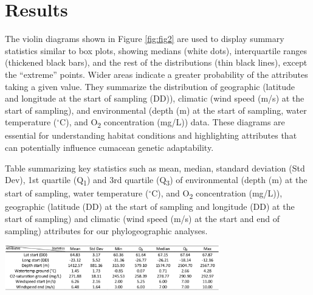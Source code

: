 \section{Results}\label{results}
The violin diagrams shown in Figure \ref{fig:fig2} are used to display summary statistics similar to box plots, showing medians (white dots), interquartile ranges (thickened black bars), and the rest of the distributions (thin black lines), except the ``extreme'' points. Wider areas indicate a greater probability of the attributes taking a given value. They summarize the distribution of geographic (latitude and longitude at the start of sampling (DD)), climatic (wind speed (m/s) at the start of sampling), and environmental (depth (m) at the start of sampling, water temperature ($^\circ$C), and O\textsubscript{2} concentration (mg/L)) data. These diagrams are essential for understanding habitat conditions and highlighting attributes that can potentially influence cumacean genetic adaptability. 

\begin{table}[H]
    \centering
    \caption{Table summarizing key statistics such as mean, median, standard deviation (Std Dev), 1st quartile (Q\textsubscript{1}) and 3rd quartile (Q\textsubscript{3}) of environmental (depth (m) at the start of sampling, water temperature ($^\circ$C), and O\textsubscript{2} concentration (mg/L)), geographic (latitude (DD) at the start of sampling and longitude (DD) at the start of sampling) and climatic (wind speed (m/s) at the start and end of sampling) attributes for our phylogeographic analyses. \label{fig:tab1}}
    \includegraphics[width=0.7\textwidth]{Table_Attributes_Data.png}
\end{table}

